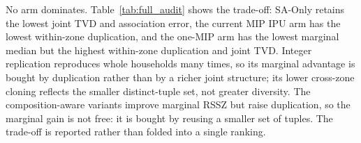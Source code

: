 No arm dominates. Table~\ref{tab:full_audit} shows the trade-off: SA-Only
retains the lowest joint TVD and association error, the current MIP IPU arm has
the lowest within-zone duplication, and the one-MIP arm has the lowest marginal
median but the highest within-zone duplication and joint TVD. Integer
replication reproduces whole households many times, so its marginal advantage is
bought by duplication rather than by a richer joint structure; its lower
cross-zone cloning reflects the smaller distinct-tuple set, not greater
diversity. The composition-aware variants improve marginal RSSZ but raise
duplication, so the marginal gain is not free: it is bought by reusing a smaller
set of tuples. The trade-off is reported rather than folded into a single
ranking.
